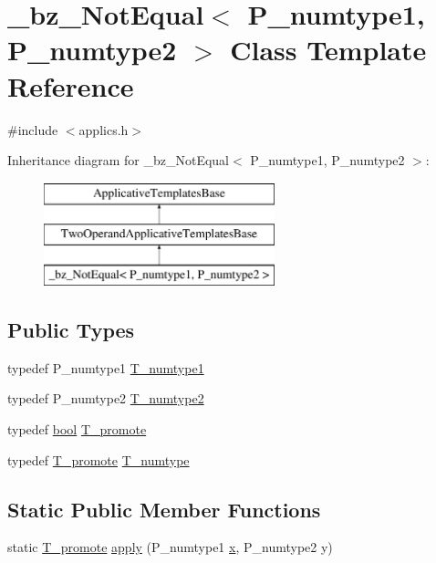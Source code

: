 \hypertarget{class__bz__NotEqual}{}\section{\+\_\+bz\+\_\+\+Not\+Equal$<$ P\+\_\+numtype1, P\+\_\+numtype2 $>$ Class Template Reference}
\label{class__bz__NotEqual}


{\ttfamily \#include $<$applics.\+h$>$}

Inheritance diagram for \+\_\+bz\+\_\+\+Not\+Equal$<$ P\+\_\+numtype1, P\+\_\+numtype2 $>$\+:\begin{figure}[H]
\begin{center}
\leavevmode
\includegraphics[height=3.000000cm]{class__bz__NotEqual}
\end{center}
\end{figure}
\subsection*{Public Types}
\begin{DoxyCompactItemize}
\item 
typedef P\+\_\+numtype1 \hyperlink{class__bz__NotEqual_a465bf93f3414ff7781b00e8c595aaa70}{T\+\_\+numtype1}
\item 
typedef P\+\_\+numtype2 \hyperlink{class__bz__NotEqual_adc1ba7b55abe2073c13aefa8c201ac03}{T\+\_\+numtype2}
\item 
typedef \hyperlink{compiler_8h_abb452686968e48b67397da5f97445f5b}{bool} \hyperlink{class__bz__NotEqual_a4674656940422bb8f41fc717c70e185c}{T\+\_\+promote}
\item 
typedef \hyperlink{class__bz__NotEqual_a4674656940422bb8f41fc717c70e185c}{T\+\_\+promote} \hyperlink{class__bz__NotEqual_a27a166792b382a657c782168a32be651}{T\+\_\+numtype}
\end{DoxyCompactItemize}
\subsection*{Static Public Member Functions}
\begin{DoxyCompactItemize}
\item 
static \hyperlink{class__bz__NotEqual_a4674656940422bb8f41fc717c70e185c}{T\+\_\+promote} \hyperlink{class__bz__NotEqual_ac314fb11c6117a1a566e3734ff1b6854}{apply} (P\+\_\+numtype1 \hyperlink{vecnorm1_8cc_ac73eed9e41ec09d58f112f06c2d6cb63}{x}, P\+\_\+numtype2 y)
\end{DoxyCompactItemize}


